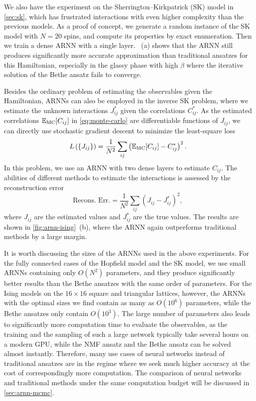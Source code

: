 We also have the experiment on the Sherrington--Kirkpatrick (SK) model in \cref{sec:sk}, which has frustrated interactions with even higher complexity than the previous models. As a proof of concept, we generate a random instance of the SK model with $N = 20$ spins, and compute its properties by exact enumeration. Then we train a dense ARNN with a single layer. ~(a) shows that the ARNN still produces significantly more accurate approximation than traditional ansatzes for this Hamiltonian, especially in the glassy phase with high $\beta$ where the iterative solution of the Bethe ansatz fails to converge.

Besides the ordinary problem of estimating the observables given the Hamiltonian, ARNNs can also be employed in the inverse SK problem, where we estimate the unknown interactions $J^*_{i j}$ given the correlations $C^*_{i j}$. As the estimated correlations $\mathbb{E}_\text{MC}[C_{i j}]$ in \cref{eq:monte-carlo} are differentiable functions of $J_{i j}$, we can directly use stochastic gradient descent to minimize the least-square loss
\begin{equation}
L\left( \{J_{i j}\} \right) = \frac{1}{N^2} \sum_{i j} \left( \mathbb{E}_\text{MC}[C_{i j}] - C^*_{i j} \right)^2.
\end{equation}
In this problem, we use an ARNN with two dense layers to estimate $C_{i j}$. The abilities of different methods to estimate the interactions is assessed by the reconstruction error
\begin{equation}
\text{Recons. Err.} = \frac{1}{N^2} \sum_{i j} \left( J_{i j} - J^*_{i j} \right)^2,
\end{equation}
where $J_{i j}$ are the estimated values and $J^*_{i j}$ are the true values. The results are shown in \cref{fig:arnn-ising}~(b), where the ARNN again outperforms traditional methods by a large margin.

It is worth discussing the sizes of the ARNNs used in the above experiments. For the fully connected cases of the Hopfield model and the SK model, we use small ARNNs containing only $O(N^2)$ parameters, and they produce significantly better results than the Bethe ansatzes with the same order of parameters. For the Ising models on the $16 \times 16$ square and triangular lattices, however, the ARNNs with the optimal sizes we find contain as many as $O(10^6)$ parameters, while the Bethe ansatzes only contain $O(10^3)$. The large number of parameters also leads to significantly more computation time to evaluate the observables, as the training and the sampling of such a large network typically take several hours on a modern GPU, while the NMF ansatz and the Bethe ansatz can be solved almost instantly. Therefore, many use cases of neural networks instead of traditional ansatzes are in the regime where we seek much higher accuracy at the cost of correspondingly more computation. The comparison of neural networks and traditional methods under the same computation budget will be discussed in \cref{sec:arnn-mcmc}.

